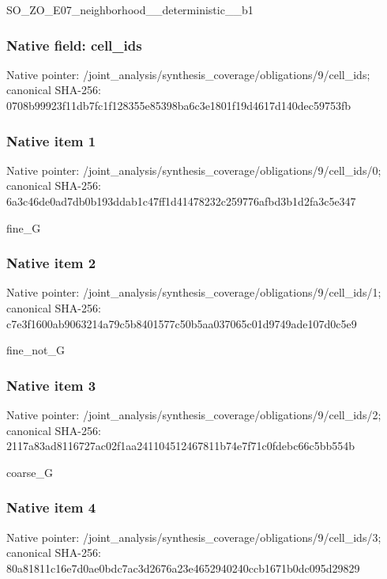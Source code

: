 \documentclass[10pt,a4paper]{article}
\begin{document}
\begingroup\raggedright\sloppy SO\_\allowbreak{}ZO\_\allowbreak{}E07\_\allowbreak{}neighborhood\_\allowbreak{}\_\allowbreak{}deterministic\_\allowbreak{}\_\allowbreak{}b1\par\endgroup

\subsubsection{Native field: cell\_\allowbreak{}ids}
Native pointer: /joint\_\allowbreak{}analysis/synthesis\_\allowbreak{}coverage/obligations/9/cell\_\allowbreak{}ids; canonical SHA-256: 0708b99923f11db7fc1f128355e85398ba6c3e1801f19d4617d140dec59753fb

\subsubsection{Native item 1}
Native pointer: /joint\_\allowbreak{}analysis/synthesis\_\allowbreak{}coverage/obligations/9/cell\_\allowbreak{}ids/0; canonical SHA-256: 6a3c46de0ad7db0b193ddab1c47ff1d41478232c259776afbd3b1d2fa3c5e347

\begingroup\raggedright\sloppy fine\_\allowbreak{}G\par\endgroup

\subsubsection{Native item 2}
Native pointer: /joint\_\allowbreak{}analysis/synthesis\_\allowbreak{}coverage/obligations/9/cell\_\allowbreak{}ids/1; canonical SHA-256: c7e3f1600ab9063214a79c5b8401577c50b5aa037065c01d9749ade107d0c5e9

\begingroup\raggedright\sloppy fine\_\allowbreak{}not\_\allowbreak{}G\par\endgroup

\subsubsection{Native item 3}
Native pointer: /joint\_\allowbreak{}analysis/synthesis\_\allowbreak{}coverage/obligations/9/cell\_\allowbreak{}ids/2; canonical SHA-256: 2117a83ad8116727ac02f1aa241104512467811b74e7f71c0fdebc66c5bb554b

\begingroup\raggedright\sloppy coarse\_\allowbreak{}G\par\endgroup

\subsubsection{Native item 4}
Native pointer: /joint\_\allowbreak{}analysis/synthesis\_\allowbreak{}coverage/obligations/9/cell\_\allowbreak{}ids/3; canonical SHA-256: 80a81811c16e7d0ae0bdc7ac3d2676a23e4652940240ccb1671b0dc095d29829
\end{document}
